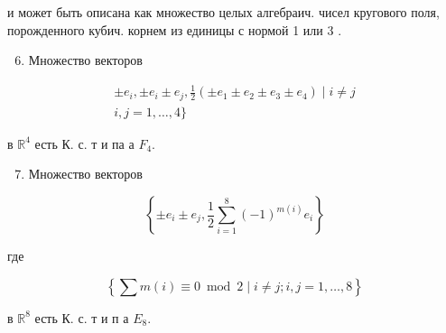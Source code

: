 \documentclass[10pt]{article}
\begin{document}
и может быть описана как множество целых алгебраич. чисел кругового поля, порожденного кубич. корнем из единицы с нормой 1 или 3 .



\begin{enumerate}

  \setcounter{enumi}{5}

  \item Множество векторов

\end{enumerate}



\[

\begin{gathered}

\pm e_{i}, \pm e_{i} \pm e_{j}, \frac{1}{2}\left( \pm e_{1} \pm e_{2} \pm e_{3} \pm e_{4}\right) \mid i \neq j \\

i, j=1, \ldots, 4\}

\end{gathered}

\]



в $\mathbb{R}^{4}$ есть К. с. т и па а $F_{4}$.



\begin{enumerate}

  \setcounter{enumi}{6}

  \item Множество векторов

\end{enumerate}



\[

\left\{ \pm e_{i} \pm e_{j}, \frac{1}{2} \sum_{i=1}^{8}(-1)^{m(i)} e_{i}\right\}

\]



где



\[

\left\{\sum m(i) \equiv 0 \bmod 2 \mid i \neq j ; i, j=1, \ldots, 8\right\}

\]



в $\mathbb{R}^{8}$ есть К. с. т и п а $E_{8}$.
\end{document}

